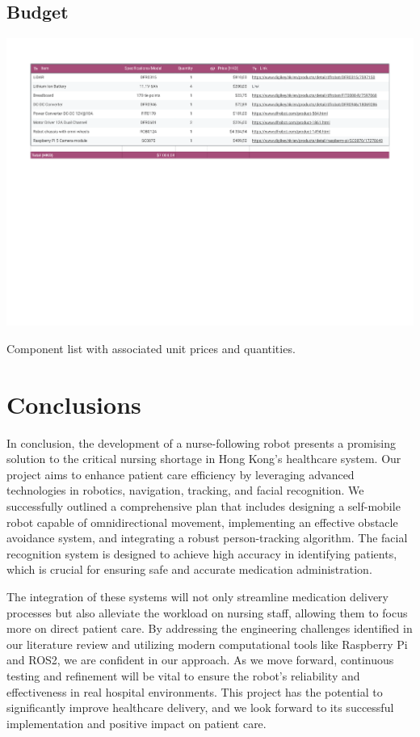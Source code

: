 \documentclass{article}
\begin{document}
\subsection{Budget}
\begin{table}[H]
    \centering
    \includegraphics[width=\textwidth]{media/ProjectBudget - Arkusz2.pdf} %
    \vspace{-6cm}
    \caption{Component list with associated unit prices and quantities.}
    \label{table:budget}
\end{table}
\section{Conclusions}
In conclusion, the development of a nurse-following robot presents a promising solution to the critical nursing shortage in Hong Kong's healthcare system. Our project aims to enhance patient care efficiency by leveraging advanced technologies in robotics, navigation, tracking, and facial recognition. We successfully outlined a comprehensive plan that includes designing a self-mobile robot capable of omnidirectional movement, implementing an effective obstacle avoidance system, and integrating a robust person-tracking algorithm. The facial recognition system is designed to achieve high accuracy in identifying patients, which is crucial for ensuring safe and accurate medication administration.

The integration of these systems will not only streamline medication delivery processes but also alleviate the workload on nursing staff, allowing them to focus more on direct patient care. By addressing the engineering challenges identified in our literature review and utilizing modern computational tools like Raspberry Pi and ROS2, we are confident in our approach. As we move forward, continuous testing and refinement will be vital to ensure the robot's reliability and effectiveness in real hospital environments. This project has the potential to significantly improve healthcare delivery, and we look forward to its successful implementation and positive impact on patient care.
\newpage
{}
{}
\printbibliography
\end{document}
